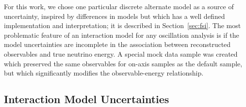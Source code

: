 
For this work, we chose one particular discrete alternate model as a source of uncertainty, inspired by differences in models but which has a well defined implementation and interpretation; it is described in Section~\ref{sec:fsi}. The most problematic feature of an interaction model for any oscillation analysis is if the model uncertainties are incomplete in the association between reconstructed observables and true neutrino energy. A special mock data sample was created which preserved the same observables for on-axis samples as the default sample, but which significantly modifies the observable-energy relationship.


\subsection{Interaction Model Uncertainties}

